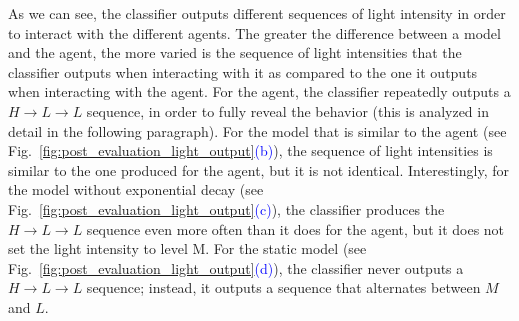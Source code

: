 As we can see, the classifier outputs different sequences of light intensity in order to interact with the different agents. The greater the difference between a model and the agent, the more varied is the sequence of light intensities that the classifier outputs when interacting with it as compared to the one it outputs when interacting with the agent. For the agent, the classifier repeatedly outputs a $H\rightarrow L\rightarrow L$ sequence, in order to fully reveal the behavior (this is analyzed in detail in the following paragraph). For the model that is similar to the agent (see Fig.~\ref{fig:post_evaluation_light_output}\textcolor{blue}{(b)}), the sequence of light intensities is similar to the one produced for the agent, but it is not identical. Interestingly, for the model without exponential decay (see Fig.~\ref{fig:post_evaluation_light_output}\textcolor{blue}{(c)}), the classifier produces the $H\rightarrow L\rightarrow L$ sequence even more often than it does for the agent, but it does not set the light intensity to level M. For the static model (see Fig.~\ref{fig:post_evaluation_light_output}\textcolor{blue}{(d)}), the classifier never outputs a $H\rightarrow L\rightarrow L$ sequence; instead, it outputs a sequence that alternates between $M$ and $L$.

